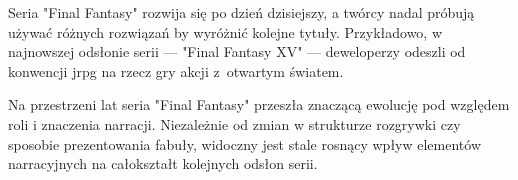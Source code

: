 Seria "Final Fantasy" rozwija się po dzień dzisiejszy, a twórcy nadal próbują używać różnych rozwiązań by
wyróżnić kolejne tytuły. Przykładowo, w najnowszej odsłonie serii --- "Final Fantasy XV" --- deweloperzy
odeszli od konwencji \gls{jrpg} na rzecz gry akcji z~otwartym światem.

Na przestrzeni lat seria "Final Fantasy" przeszła znaczącą ewolucję pod względem roli i znaczenia narracji.
Niezależnie od zmian w strukturze rozgrywki czy sposobie prezentowania fabuły, widoczny jest stale rosnący
wpływ elementów narracyjnych na całokształt kolejnych odsłon serii.